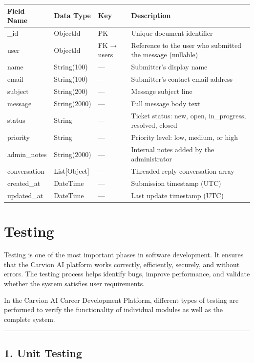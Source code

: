 \documentclass[12pt]{article}
\begin{document}
\begin{longtable}{|p{}|p{}|p{}|p{}|}
\hline
\textbf{Field Name} & \textbf{Data Type} & \textbf{Key} & \textbf{Description} \\ \hline
\endhead
\_id & ObjectId & PK & Unique document identifier \\ \hline
user & ObjectId & FK → users & Reference to the user who submitted the message (nullable) \\ \hline
name & String(100) & — & Submitter's display name \\ \hline
email & String(100) & — & Submitter's contact email address \\ \hline
subject & String(200) & — & Message subject line \\ \hline
message & String(2000) & — & Full message body text \\ \hline
status & String & — & Ticket status: new, open, in\_progress, resolved, closed \\ \hline
priority & String & — & Priority level: low, medium, or high \\ \hline
admin\_notes & String(2000) & — & Internal notes added by the administrator \\ \hline
conversation & List[Object] & — & Threaded reply conversation array \\ \hline
created\_at & DateTime & — & Submission timestamp (UTC) \\ \hline
updated\_at & DateTime & — & Last update timestamp (UTC) \\ \hline
\end{longtable}


\clearpage
\section{Testing}

Testing is one of the most important phases in software development. It ensures that the Carvion AI platform works correctly, efficiently, securely, and without errors. The testing process helps identify bugs, improve performance, and validate whether the system satisfies user requirements.

In the Carvion AI Career Development Platform, different types of testing are performed to verify the functionality of individual modules as well as the complete system.

\noindent\rule{\textwidth}{0.4pt}

\subsection{1. Unit Testing}
\end{document}
